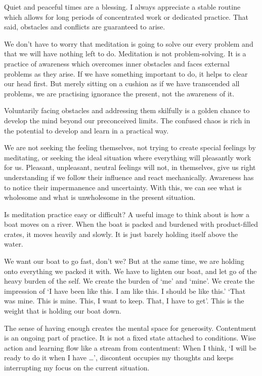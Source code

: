 \vfill\null
\clearpage

Quiet and peaceful times are a blessing. I always appreciate a stable
routine which allows for long periods of concentrated work or dedicated
practice. That said, obstacles and conflicts are guaranteed to arise.

We don't have to worry that meditation is going to solve our every
problem and that we will have nothing left to do. Meditation is not
problem-solving. It is a practice of awareness which overcomes inner
obstacles and faces external problems as they arise. If we have
something important to do, it helps to clear our head first. But merely
sitting on a cushion as if we have transcended all problems, we are
practising ignorance the present, not the awareness of it.

Voluntarily facing obstacles and addressing them skilfully is a golden
chance to develop the mind beyond our preconceived limits. The confused
chaos is rich in the potential to develop and learn in a practical way.

We are not seeking the feeling themselves, not trying to create special
feelings by meditating, or seeking the ideal situation where everything
will pleasantly work for us. Pleasant, unpleasant, neutral feelings will
not, in themselves, give us right understanding if we follow their
influence and react mechanically. Awareness has to notice their
impermanence and uncertainty. With this, we can see what is wholesome
and what is unwholesome in the present situation.

\enlargethispage*{\baselineskip}


Is meditation practice easy or difficult? A useful image to think about
is how a boat moves on a river. When the boat is packed and burdened
with product-filled crates, it moves heavily and slowly. It is just
barely holding itself above the water.

We want our boat to go fast, don't we? But at the same time, we are
holding onto everything we packed it with. We have to lighten our boat,
and let go of the heavy burden of the self. We create the burden of `me'
and `mine'. We create the impression of `I have been like this. I am
like this. I should be like this.' `That was mine. This is mine. This, I
want to keep. That, I have to get'. This is the weight that is holding
our boat down.

The sense of having enough creates the mental space for generosity.
Contentment is an ongoing part of practice. It is not a fixed state
attached to conditions. Wise action and learning flow like a stream from
contentment: When I think, `I will be ready to do it when I have
\ldots{}', discontent occupies my thoughts and keeps interrupting my
focus on the current situation.

